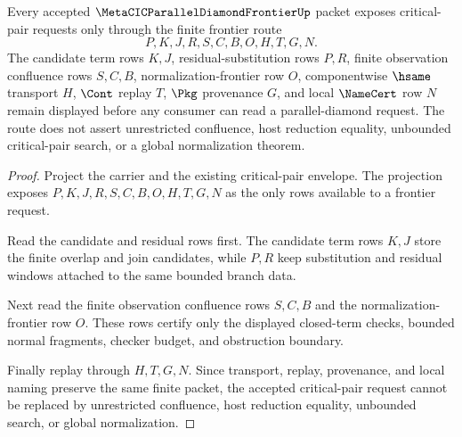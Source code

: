 \begin{theorem}
\label{thm:metacic-parallel-diamond-frontier-critical-pair-envelope}
Every accepted $\MetaCICParallelDiamondFrontierUp$ packet exposes critical-pair requests only through the finite frontier route
$$
P,K,J,R,S,C,B,O,H,T,G,N .
$$
The candidate term rows $K,J$, residual-substitution rows $P,R$, finite observation confluence rows $S,C,B$, normalization-frontier row $O$, componentwise $\hsame$ transport $H$, $\Cont$ replay $T$, $\Pkg$ provenance $G$, and local $\NameCert$ row $N$ remain displayed before any consumer can read a parallel-diamond request. The route does not assert unrestricted confluence, host reduction equality, unbounded critical-pair search, or a global normalization theorem.
\end{theorem}
\begin{proof}
Project the carrier and the existing critical-pair envelope. The projection exposes $P,K,J,R,S,C,B,O,H,T,G,N$ as the only rows available to a frontier request.

Read the candidate and residual rows first. The candidate term rows $K,J$ store the finite overlap and join candidates, while $P,R$ keep substitution and residual windows attached to the same bounded branch data.

Next read the finite observation confluence rows $S,C,B$ and the normalization-frontier row $O$. These rows certify only the displayed closed-term checks, bounded normal fragments, checker budget, and obstruction boundary.

Finally replay through $H,T,G,N$. Since transport, replay, provenance, and local naming preserve the same finite packet, the accepted critical-pair request cannot be replaced by unrestricted confluence, host reduction equality, unbounded search, or global normalization.
\end{proof}

